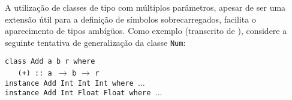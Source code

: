 A utiliza\c{c}\~ao de classes de tipo com m\'ultiplos par\^ametros, apesar de ser uma extens\~ao \'util
para a defini\c{c}\~ao de s\'imbolos sobrecarregados, facilita o aparecimento de tipos amb\'ig\"uos.  
 Como exemplo (transcrito de \cite{Haskell07}), considere a seguinte tentativa de 
 generaliza\c{c}\~ao da classe \texttt{Num}:
\begin{flushleft}
   \texttt{class Add a b r where}\\
   \verb|   (+) :: a |$\rightarrow$ \verb|b| $\rightarrow$ \verb|r|\\
   \texttt{instance Add Int Int Int where $\ldots$}\\
   \texttt{instance Add Int Float Float where $\ldots$}\\
\end{flushleft}

